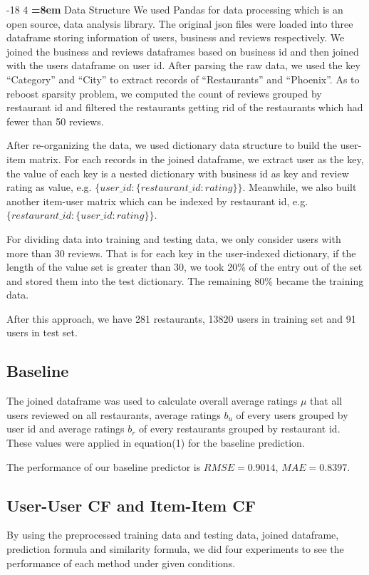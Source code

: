 \documentclass{llncs}
\makeatletter
\renewcommand\subsubsection{\@startsection{subsubsection}{3}{\z@}%
	{-18\p@ \@plus -4\p@ \@minus -4\p@}%
	{4\p@ \@plus 2\p@ \@minus 2\p@}%
	{\normalfont\normalsize\bfseries\boldmath
		\rightskip=\z@ \@plus 8em\pretolerance=10000 }}
\makeatother
\begin{document}
\subsubsection{Data Structure}
We used Pandas for data processing which is an open source, data analysis library. The original json files were loaded into three dataframe storing information of users, business and reviews respectively. We joined the business and reviews dataframes based on business id and then joined with the users dataframe on user id. After parsing the raw data, we used the key “Category” and “City” to extract records of “Restaurants” and “Phoenix”. As to reboost sparsity problem, we computed the count of reviews grouped by restaurant id and filtered the restaurants getting rid of the restaurants which had fewer than 50 reviews. 

After re-organizing the data, we used dictionary data structure to build the user-item matrix. For each records in the joined dataframe, we extract user as the key, the value of each key is a nested dictionary with business id as key and review rating as value, e.g. $\{user\_id: \{restaurant\_id: rating\}\}$. Meanwhile, we also built another item-user matrix which can be indexed by restaurant id, e.g. $\{restaurant\_id: \{user\_id: rating\}\}$.

For dividing data into training and testing data, we only consider users with more than 30 reviews. That is for each key in the user-indexed dictionary, if the length of the value set is greater than 30, we took 20\% of the entry out of the set and stored them into the test dictionary. The remaining 80\% became the training data. 

After this approach, we have 281 restaurants, 13820 users in training set and 91 users in test set.
\subsection{Baseline}
The joined dataframe was used to calculate overall average ratings $\mu$ that all users reviewed on all restaurants, average ratings $b_u$ of every users grouped by user id and average ratings $b_r$ of every restaurants grouped by restaurant id. These values were applied in equation(1) for the baseline prediction.

The performance of our baseline predictor is $RMSE = 0.9014 $, $MAE = 0.8397$.

\subsection{User-User CF and Item-Item CF}
By using the preprocessed training data and testing data, joined dataframe, prediction formula and similarity formula, we did four experiments to see the performance of each method under given conditions.   
\end{document}
